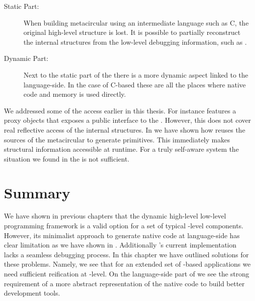 \begin{description}
	\item[Static Part:] 
	When building metacircular \VMs using an intermediate language such as C, the original high-level structure is lost.
	It is possible to partially reconstruct the internal structures from the low-level debugging information, such as \Dwarf.
	
	\item[Dynamic Part:]
	Next to the static part of the \VM there is a more dynamic aspect linked to the language-side.
	In the case of C-based \VM these are all the places where native code and memory is used directly.
\end{description}

We addressed some of the access earlier in this thesis.
For instance \NB features a \VM proxy objects that exposes a public interface to the \VM.
However, this does not cover real reflective access of the \VM internal structures.
In  we have shown how \WF reuses the sources of the metacircular \VM to generate primitives.
This immediately makes structural information accessible at runtime.
For a truly self-aware system the situation we found in the \PH \VM is not sufficient.


\section{Summary}

We have shown in previous chapters that the dynamic high-level low-level programming framework \B is a valid option for a set of typical \VM-level components.
However, its minimalist approach to generate native code at language-side has clear limitation as we have shown \NBJ in .
Additionally \B's current implementation lacks a seamless debugging process.
In this chapter we have outlined solutions for these problems.
Namely, we see that for an extended set of \B-based applications we need sufficient reification at \VM-level.
On the language-side part of \B we see the strong requirement of a more abstract representation of the native code to build better development tools.


